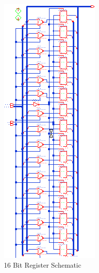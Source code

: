 \documentclass[11pt]{article}
\begin{document}
		\begin{figure}[H] 
			\centering 
			\includegraphics[width=\textwidth,height=\dimexpr\textheight-4\baselineskip-\abovecaptionskip-\belowcaptionskip\relax,keepaspectratio]{"Pictures/nBitRegister 16-Bit Schematic"}
			\caption{16 Bit Register Schematic} 
			\label{fig:nBitRegister-16-Bit-Schematic} 
		\end{figure}
\end{document}
